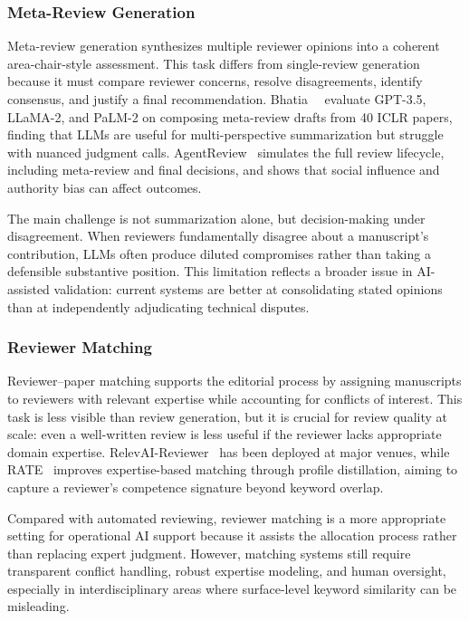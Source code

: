 \subsubsection{Meta-Review Generation}
\label{sec:metareview}

Meta-review generation synthesizes multiple reviewer opinions into a coherent area-chair-style assessment. This task differs from single-review generation because it must compare reviewer concerns, resolve disagreements, identify consensus, and justify a final recommendation. Bhatia~\etal~\cite{metareviewllm2024} evaluate GPT-3.5, LLaMA-2, and PaLM-2 on composing meta-review drafts from 40 ICLR papers, finding that LLMs are useful for multi-perspective summarization but struggle with nuanced judgment calls. AgentReview~\cite{agentreview2024} simulates the full review lifecycle, including meta-review and final decisions, and shows that social influence and authority bias can affect outcomes.

The main challenge is not summarization alone, but decision-making under disagreement. When reviewers fundamentally disagree about a manuscript's contribution, LLMs often produce diluted compromises rather than taking a defensible substantive position. This limitation reflects a broader issue in AI-assisted validation: current systems are better at consolidating stated opinions than at independently adjudicating technical disputes.



\subsubsection{Reviewer Matching}
\label{sec:reviewer_matching}

Reviewer--paper matching supports the editorial process by assigning manuscripts to reviewers with relevant expertise while accounting for conflicts of interest. This task is less visible than review generation, but it is crucial for review quality at scale: even a well-written review is less useful if the reviewer lacks appropriate domain expertise. RelevAI-Reviewer~\cite{relevaireviewer2024} has been deployed at major venues, while RATE~\cite{rate2026} improves expertise-based matching through profile distillation, aiming to capture a reviewer's competence signature beyond keyword overlap.

Compared with automated reviewing, reviewer matching is a more appropriate setting for operational AI support because it assists the allocation process rather than replacing expert judgment. However, matching systems still require transparent conflict handling, robust expertise modeling, and human oversight, especially in interdisciplinary areas where surface-level keyword similarity can be misleading.




